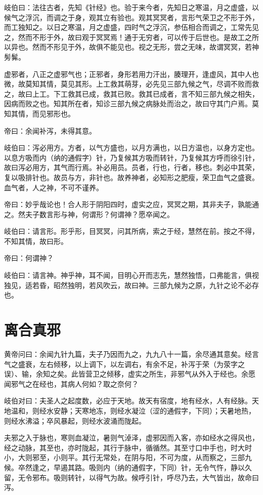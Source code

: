 \documentclass{article}%
\begin{document}
岐伯曰：法往古者，先知《针经》也。验于来今者，先知日之寒温，月之虚盛，以候气之浮沉，而调之于身，观其立有验也。观其冥冥者，言形气荣卫之不形于外，而工独知之。以日之寒温，月之虚盛，四时气之浮沉，参伍相合而调之，工常先见之，然而不形于外，故曰观于冥冥焉！通于无穷者，可以传于后世也。是故工之所以异也。然而不形见于外，故俱不能见也。视之无形，尝之无味，故谓冥冥，若神髣髴。

虚邪者，八正之虚邪气也；正邪者，身形若用力汗出，腠理开，逢虚风，其中人也微，故莫知其情，莫见其形。上工救其萌芽，必先见三部九候之气，尽调不败而救之，故曰上工。下工救其已成，救其已败。救其已成者，言不知三部九候之相失，因病而败之也。知其所在者，知诊三部九候之病脉处而治之，故曰守其门户焉。莫知其情，而见邪形也。

帝曰：余闻补泻，未得其意。

岐伯曰：泻必用方。方者，以气方盛也，以月方满也，以日方温也，以身方定也。以息方吸而内（纳的通假字）针，乃复候其方吸而转针，乃复候其方呼而徐引针，故曰泻必用方，其气而行焉。补必用员。员者，行也，行者，移也。刺必中其荣，复以吸排针也。故员与方，非针也。故养神者，必知形之肥瘦，荣卫血气之盛衰。血气者，人之神，不可不谨养。

帝曰：妙乎哉论也！合人形于阴阳四时，虚实之应，冥冥之期，其非夫子，孰能通之。然夫子数言形与神，何谓形？何谓神？愿卒闻之。

岐伯曰：请言形。形乎形，目冥冥，问其所病，索之于经，慧然在前。按之不得，不知其情，故曰形。

帝曰：何谓神？

岐伯曰：请言神。神乎神，耳不闻，目明心开而志先，慧然独悟，口弗能言，俱视独见，适若昏，昭然独明，若风吹云，故曰神。三部九候为之原，九针之论不必存也。
\section{离合真邪}
黄帝问曰：余闻九针九篇，夫子乃因而九之，九九八十一篇，余尽通其意矣。经言气之盛衰，左右倾移，以上调下，以左调右，有余不足，补泻于荣（为荥字之误）、输，余知之矣。此皆营卫之倾移，虚实之所生，非邪气从外入于经也。余愿闻邪气之在经也，其病人何如？取之奈何？

岐伯对曰：夫圣人之起度数，必应于天地。故天有宿度，地有经水，人有经脉。天地温和，则经水安静；天寒地冻，则经水凝泣（涩的通假字，下同）；天暑地热，则经水沸溢；卒风暴起，则经水波涌而陇起。

夫邪之入于脉也，寒则血凝泣，暑则气淖泽，虚邪因而入客，亦如经水之得风也，经之动脉，其至也，亦时陇起，其行于脉中，循循然。其至寸口中手也，时大时小，大则邪至，小则平。其行无常处，在阴与阳，不可为度，从而察之，三部九候。卒然逢之，早遏其路。吸则内（纳的通假字，下同）针，无令气忤，静以久留，无令邪布。吸则转针，以得气为故。候呼引针，呼尽乃去，大气皆出，故命曰泻。
\end{document}
